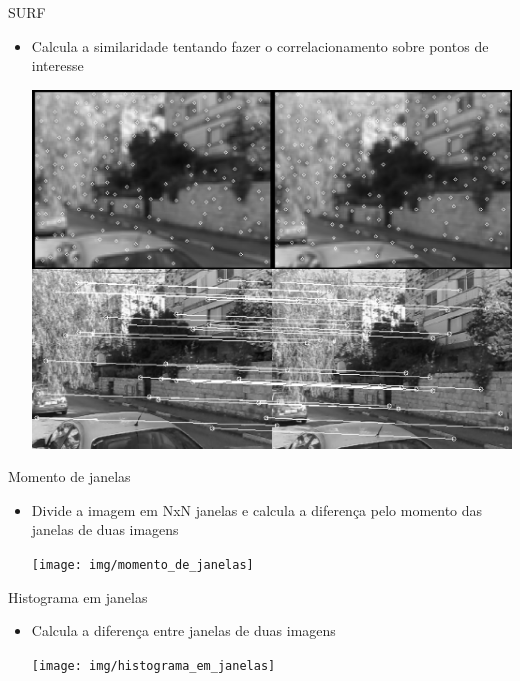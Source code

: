 \documentclass[
    style=paintings,
    paper=screen,
    blackslide,
    nopagebreaks,
    fleqn
]{powerdot}
\begin{document}
\begin{slide}{SURF}
\begin{itemize}[type=1]
\item <1-> Calcula a similaridade tentando fazer o correlacionamento sobre pontos de interesse
\begin{center}
\includegraphics[width=0.80\linewidth]{img/SURF}
\end{center}
\end{itemize}
\end{slide}


\begin{slide}{Momento de janelas}
\begin{itemize}[type=1]
\item <1-> Divide a imagem em NxN janelas e calcula a diferença pelo momento
das janelas de duas imagens
\begin{center}
\texttt{[image: img/momento\_de\_janelas]}
\end{center}
\end{itemize}
\end{slide}


\begin{slide}{Histograma em janelas}
\begin{itemize}[type=1]
\item <1-> Calcula a diferença entre janelas de duas imagens
\begin{center}
\texttt{[image: img/histograma\_em\_janelas]}
\end{center}
\end{itemize}
\end{slide}
\end{document}
